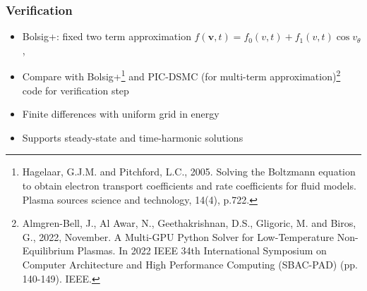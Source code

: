 \documentclass[mathserif, aspectratio=169]{beamer}
\newcommand{\vect}[1]{\boldsymbol{#1}}
\begin{document}
\begin{frame}
	\frametitle{Verification}
	\begin{itemize}
		\item Bolsig+: fixed two term approximation $f(\vect{v},t) = f_0(v, t) + f_1(v,t)\cos v_\theta$, %
		\item Compare with Bolsig+\footnote[frame]{Hagelaar, G.J.M. and Pitchford, L.C., 2005. Solving the Boltzmann equation to obtain electron transport coefficients and rate coefficients for fluid models. Plasma sources science and technology, 14(4), p.722.} and PIC-DSMC (for multi-term approximation)\footnote[frame]{Almgren-Bell, J., Al Awar, N., Geethakrishnan, D.S., Gligoric, M. and Biros, G., 2022, November. A Multi-GPU Python Solver for Low-Temperature Non-Equilibrium Plasmas. In 2022 IEEE 34th International Symposium on Computer Architecture and High Performance Computing (SBAC-PAD) (pp. 140-149). IEEE.} code for verification step 
		\item Finite differences with uniform grid in energy
		\item Supports steady-state and time-harmonic solutions
	\end{itemize}
\end{frame}

\end{document}
